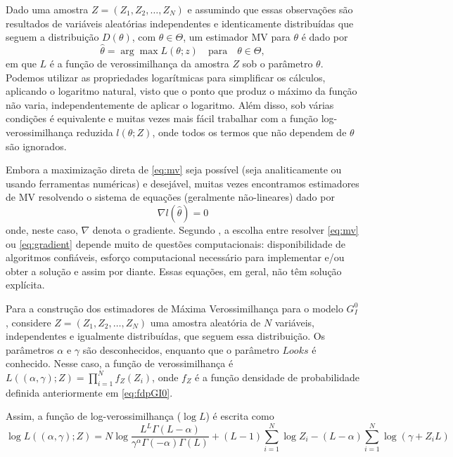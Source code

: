\documentclass[12pt]{article}
\begin{document}
Dado uma amostra $Z = (Z_1, Z_2, \dots, Z_N)$ e assumindo que essas observações são resultados de variáveis aleatórias independentes e identicamente distribuídas que seguem a distribuição $D(\theta)$, com $\theta \in \Theta$, um estimador MV para $\theta$ é dado por
\begin{equation}
    \widehat{\theta} = \arg\max L(\theta; z) \quad \text{para} \quad \theta \in \Theta, \label{eq:mv}
\end{equation}
em que $L$ é a função de verossimilhança da amostra $Z$ sob o parâmetro $\theta$. Podemos utilizar as propriedades logarítmicas para simplificar os cálculos, aplicando o logaritmo natural, visto que o ponto que produz o máximo da função não varia, independentemente de aplicar o logaritmo. Além disso, sob várias condições é equivalente e muitas vezes mais fácil trabalhar com a função log-verossimilhança reduzida $l(\theta; Z)$, onde todos os termos que não dependem de $\theta$ são ignorados.

Embora a maximização direta de \eqref{eq:mv} seja possível (seja analiticamente ou usando ferramentas numéricas) e desejável, muitas vezes encontramos estimadores de MV resolvendo o sistema de equações (geralmente não-lineares) dado por
\begin{equation}
    \nabla l(\widehat{\theta}) = 0 \label{eq:gradient} 
\end{equation}
onde, neste caso, $\nabla$ denota o gradiente. Segundo \citet{FreryMinute2004}, a escolha entre resolver \eqref{eq:mv} ou \eqref{eq:gradient} depende muito de questões computacionais: disponibilidade de algoritmos confiáveis, esforço computacional necessário para implementar e/ou obter a solução e assim por diante. Essas equações, em geral, não têm solução explícita.

Para a construção dos estimadores de Máxima Verossimilhança para o modelo $G_I^0$, considere $Z = (Z_1, Z_2, \dots, Z_N)$ uma amostra aleatória de $N$ variáveis, independentes e igualmente distribuídas, que seguem essa distribuição. Os parâmetros $\alpha$ e $\gamma$ são desconhecidos, enquanto que o parâmetro $Looks$ é conhecido. Nesse caso, a função de verossimilhança é $L((\alpha, \gamma); Z) = \prod_{i=1}^{N} f_Z(Z_i)$, onde $f_Z$ é a função densidade de probabilidade definida anteriormente em \eqref{eq:fdpGI0}. 

Assim, a função de log-verossimilhança ($\log L$) é escrita como
\begin{equation}
    \log L((\alpha, \gamma); Z) = N\log \frac{L^{L}\Gamma(L-\alpha)}{\gamma^{\alpha}\Gamma(-\alpha)\Gamma(L)} +  (L-1)\sum_{i=1}^{N}\log Z_i - (L-\alpha)\sum_{i=1}^{N}\log (\gamma + Z_iL) \label{eq:logVer}
\end{equation}
\end{document}
